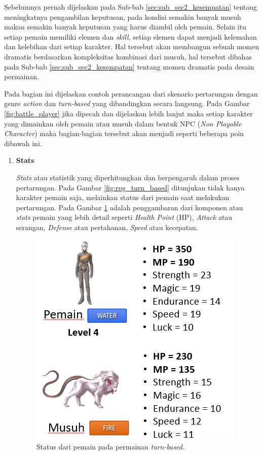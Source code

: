 \begin{subs}
	Sebelumnya pernah dijelaskan pada Sub-bab \ref{sec:sub_sec2_kesempatan} tentang meningkatnya pengambilan keputusan, pada kondisi semakin banyak musuh makan semakin banyak keputusan yang harus diambil oleh pemain. Selain itu setiap pemain memiliki elemen dan \textit{skill}, setiap elemen dapat menjadi kelemahan dan kelebihan dari setiap karakter. Hal tersebut akan membangun sebuah momen dramatis berdasarkan kompleksitas kombinasi dari musuh, hal tersebut dibahas pada Sub-bab \ref{sec:sub_sec2_kesempatan} tentang momen dramatis pada desain permainan.
	\vspace{1ex}
	
	Pada bagian ini dijelaskan contoh perancangan dari skenario pertarungan dengan genre \textit{action} dan \textit{turn-based} yang dibandingkan secara langsung. Pada Gambar \ref{fig:battle_player} jika dipecah dan dijelaskan lebih lanjut maka setiap karakter yang dimainkan oleh pemain atau musuh dalam bentuk NPC (\textit{Non Playable Character}) maka bagian-bagian tersebut akan menjadi seperti beberapa poin dibawah ini.
	\vspace{1ex}
	
	\begin{enumerate}[label=\textbf{\arabic*).}]
		
		\item \textbf{Stats}
		\setlength{\parindent}{0.8cm}
		
		\textit{Stats} atau statistik yang diperhitungkan dan berpengaruh dalam proses pertarungan. Pada Gambar \ref{fig:rpg_turn_based} ditunjukan tidak hanya karakter pemain saja, melainkan status dari pemain saat melakukan pertarungan. Pada Gambar \ref{fig:player_stats} adalah penggambaran dari komponen atau \textit{stats} pemain yang lebih detail seperti \textit{Health Point} (HP), \textit{Attack} atau serangan, \textit{Defense} atau pertahanan, \textit{Speed} atau kecepatan.
		\vspace{1ex}
		
		\begin{figure} [!h] \centering
			\includegraphics[scale=0.68]{img/player_stats.png}
			\caption{Status dari pemain pada permainan \textit{turn-based}.}
			\label{fig:player_stats}
		\end{figure}
		

\end{enumerate}
\end{subs}
